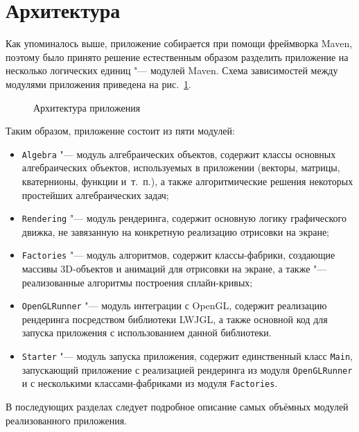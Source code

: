 \section{Архитектура}

Как упоминалось выше, приложение собирается при помощи фреймворка Maven, поэтому было принято решение естественным
образом разделить приложение на несколько логических единиц "--- модулей Maven. Схема зависимостей между модулями
приложения приведена на рис.~\ref{architecture}.

\begin{figure}[h]
\caption{Архитектура приложения}
\label{architecture}
\end{figure}

Таким образом, приложение состоит из пяти модулей:

\begin{itemize}

\item \texttt{Algebra} "--- модуль алгебраических объектов, содержит классы основных алгебраических объектов,
используемых в приложении (векторы, матрицы, кватернионы, функции и~т.~п.), а также алгоритмические решения некоторых
простейших алгебраических задач;
\item \texttt{Rendering} "--- модуль рендеринга, содержит основную логику графического движка, не завязанную
на конкретную реализацию отрисовки на экране;
\item \texttt{Factories} "--- модуль алгоритмов, содержит классы-фабрики, создающие массивы 3D-объектов и анимаций для
отрисовки на экране, а также "--- реализованные алгоритмы построения сплайн-кривых;
\item \texttt{OpenGLRunner} "--- модуль интеграции с OpenGL, содержит реализацию рендеринга посредством библиотеки
LWJGL, а также основной код для запуска приложения с использованием данной библиотеки.
\item \texttt{Starter} "--- модуль запуска приложения, содержит единственный класс \texttt{Main}, запускающий
приложение с реализацией рендеринга из модуля \texttt{OpenGLRunner} и с несколькими классами-фабриками из модуля
\texttt{Factories}.
\end{itemize}

В последующих разделах следует подробное описание самых объёмных модулей реализованного приложения.
